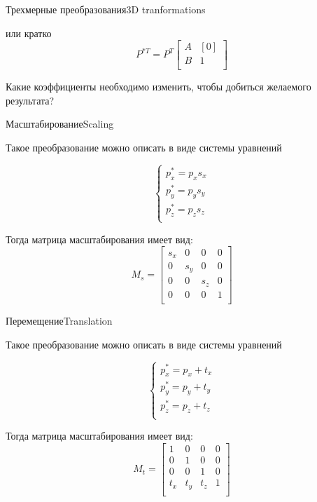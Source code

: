 \documentclass{beamer}
\begin{document}
\begin{frame}{Трехмерные преобразования}{3D tranformations}
{			или кратко
			\[
				P^{*T}
				=
				P^T
				\begin{bmatrix}
					A & [0]  \\
					B & 1 \\
				\end{bmatrix}
			\]
			
			Какие коэффициенты необходимо изменить, чтобы добиться желаемого результата?
		}
	\end{frame}

	\begin{frame}{Масштабирование}{Scaling}
		
		Такое преобразование можно описать в виде системы уравнений
		
		\[
			\begin{cases}
				p_x^{*} = p_x s_x \\
				p_y^{*} = p_y s_y \\
				p_z^{*} = p_z s_z \\
			\end{cases}
		\]

		Тогда матрица масштабирования имеет вид:
		\[
			M_s = 
			\begin{bmatrix}
				s_x & 0 & 0 & 0  \\
				0 & s_y & 0 & 0  \\
				0 & 0 & s_z & 0  \\
				0 & 0 & 0 & 1 \\
			\end{bmatrix}
		\]
		
	\end{frame}

	\begin{frame}{Перемещение}{Translation}
		
		Такое преобразование можно описать в виде системы уравнений
		
		\[
			\begin{cases}
				p_x^{*} = p_x + t_x \\
				p_y^{*} = p_y + t_y \\
				p_z^{*} = p_z + t_z \\
			\end{cases}
		\]

		Тогда матрица масштабирования имеет вид:
		\[
			M_t = 
			\begin{bmatrix}
				1 & 0 & 0 & 0  \\
				0 & 1 & 0 & 0  \\
				0 & 0 & 1 & 0  \\
				t_x & t_y & t_z & 1 \\
			\end{bmatrix}
		\]
		
		\note{}
	\end{frame}
\end{document}
